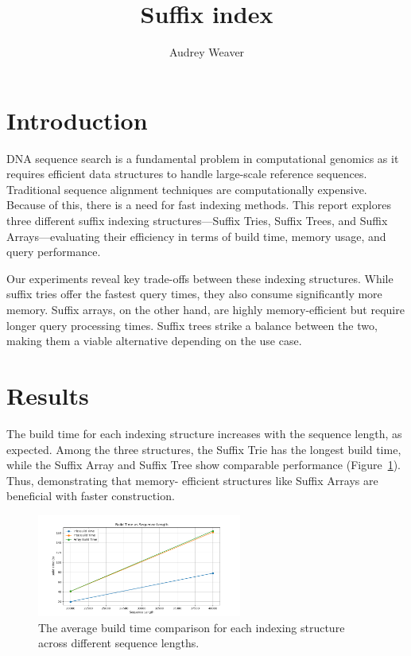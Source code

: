 \documentclass[11pt, letterpaper]{article}
\begin{document}
\title{Suffix index}
\author{Audrey Weaver}
\maketitle

\section{Introduction}
DNA sequence search is a fundamental problem in computational genomics 
as it requires efficient data structures to handle large-scale reference 
sequences. Traditional sequence alignment techniques are computationally 
expensive. Because of this, there is a need for fast indexing methods. 
This report explores three different suffix indexing structures—Suffix Tries, 
Suffix Trees, and Suffix Arrays—evaluating their efficiency in terms of build 
time, memory usage, and query performance.

Our experiments reveal key trade-offs between these indexing structures. 
While suffix tries offer the fastest query times, they also consume 
significantly more memory. Suffix arrays, on the other hand, are highly 
memory-efficient but require longer query processing times. Suffix trees 
strike a balance between the two, making them a viable alternative depending 
on the use case.

\section{Results}
The build time for each indexing structure increases with the sequence 
length, as expected. Among the three structures, the Suffix Trie has the 
longest build time, while the Suffix Array and Suffix Tree show comparable 
performance (Figure~\ref{buildtime}). Thus, demonstrating that memory-
efficient structures like Suffix Arrays are beneficial with faster construction.

\begin{figure}[ht] \centering
\includegraphics[width=0.6\textwidth]{build_time.png}
\caption{The average build time comparison for each indexing structure across 
different sequence lengths.}
\label{buildtime}
\end{figure}
\end{document}
